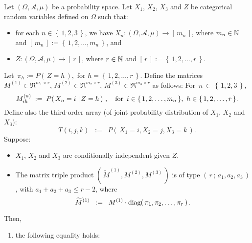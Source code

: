 \begin{corollary}
\mbox{}\vskip 0.1cm
\noindent
Let $\left(\Omega,\mathcal{A},\mu\right)$ be a probability space.
Let $X_{1}$, $X_{2}$, $X_{3}$ and $Z$ be categorical random variables defined on $\Omega$ such that:
\begin{itemize}
\item
	for each $n \in \left\{\,1, 2, 3\,\right\}$, we have
	$X_{n} : \left(\Omega,\mathcal{A},\mu\right) \longrightarrow \left[\,m_{n}\,\right]$,
	where $m_{n} \in \mathbb{N}$ and $\left[\,m_{n}\,\right] := \left\{\,1,2,\ldots,m_{n}\,\right\}$, and
\item
	$Z : \left(\Omega,\mathcal{A},\mu\right) \longrightarrow \left[\,r\,\right]$,
	where $r \in \mathbb{N}$ and $\left[\,r\,\right] := \left\{\,1,2,\ldots,r\,\right\}$.
\end{itemize}
Let \,$\pi_{h} := P\!\left(\,Z = h\,\right)$, \,for $h = \left\{\,1,2,\ldots,r\,\right\}$.
Define the matrices
$M^{(1)} \in \Re^{m_{1}\times r}$, 
$M^{(2)} \in \Re^{m_{2}\times r}$, 
$M^{(3)} \in \Re^{m_{3}\times r}$
as follows: For \,$n \,\in\, \left\{\,1,2,3\,\right\}$,
\begin{equation*}
M^{(n)}_{ih} \; := \; P\!\left(\,X_{n} = i \;\vert\, Z = h\,\right)\,,
\quad
\textnormal{for \,$i \in \left\{\,1,2,\ldots,m_{n}\,\right\}$, \,$h \in \left\{\,1,2,\ldots,r\,\right\}$}.
\end{equation*}
Define also the third-order array (of joint probability distribution of $X_{1}$, $X_{2}$ and $X_{3}$):
\begin{equation*}
T(i,j,k) \;\; := \;\; P\!\left(\,X_{1} = i, X_{2} = j, X_{3} = k \,\right).
\end{equation*}
Suppose:
\begin{itemize}
\item
	$X_{1}$, $X_{2}$ and $X_{3}$ are conditionally independent given $Z$.
\item
	The matrix triple product
	$\left(\,\widetilde{M}^{(1)},M^{(2)},M^{(3)}\,\right)$ is of type $\left(\,r\,;\,a_{1},a_{2},a_{3}\,\right)$,
	with $a_{1} + a_{2} + a_{3} \leq r - 2$, where
	\begin{equation*}
	\widetilde{M}^{(1)} \;\; := \;\; M^{(1)}\cdot\textnormal{diag}\!\left(\,\pi_{1},\pi_{2},\ldots,\pi_{r}\,\right).
	\end{equation*}
\end{itemize}
Then,
\begin{enumerate}
\item
	the following equality holds:
	\begin{equation*}

\end{equation*}
\end{enumerate}
\end{corollary}
